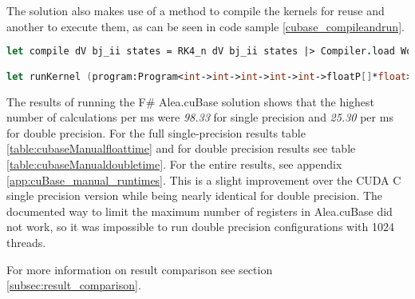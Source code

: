 The solution also makes use of a method to compile the kernels for reuse and another to execute them, as can be seen in code sample \ref{cubase_compileandrun}. 

\begin{lstlisting}[language=FSharp, caption=Kernel compilation and execution methods in F\# Alea.cuBase, label=cubase_compileandrun]
let compile dV bj_ii states = RK4_n dV bj_ii states |> Compiler.load Worker.Default

let runKernel (program:Program<int->int->int->int->int->floatP[]*float>) a b blocks threads = program.Run a b steps blocks threads
\end{lstlisting}

The results of running the F\# Alea.cuBase solution shows that the highest number of calculations per ms were \emph{98.33} for single precision and \emph{25.30} per ms for double precision.
For the full single-precision results table \ref{table:cubaseManualfloattime} and for double precision results see table \ref{table:cubaseManualdoubletime}.
For the entire results, see appendix \ref{app:cuBase_manual_runtimes}.
This is a slight improvement over the CUDA C single precision version while being nearly identical for double precision.
The documented way to limit the maximum number of registers in Alea.cuBase did not work, so it was impossible to run double precision configurations with 1024 threads.

For more information on result comparison see section \ref{subsec:result_comparison}.

\begin{table}[h!]
\centering
{}
\caption{F\# Alea.cuBase calculations per ms with single precision\label{table:cubaseManualfloattime}}
\end{table}

